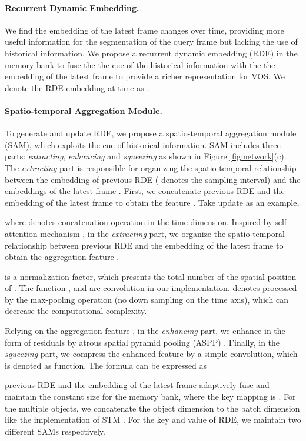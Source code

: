 \documentclass[10pt,twocolumn,letterpaper]{article}
\begin{document}
\paragraph{Recurrent Dynamic Embedding.}
We find the embedding of the latest frame changes over time, providing more useful information for the segmentation of the query frame but lacking the use of historical information. We propose a recurrent dynamic embedding (RDE) in the memory bank to fuse the the cue of the historical information with the the embedding of the latest frame to provide a richer representation for VOS. We denote the RDE embedding at time  as .  
\paragraph{Spatio-temporal Aggregation Module.} 
To generate and update RDE, we propose a spatio-temporal aggregation module (SAM), which exploits the cue of historical information.  SAM includes three parts: \textit{extracting}, \textit{enhancing} and \textit{squeezing} as shown in Figure \ref{fig:network}(c). The \textit{extracting} part is responsible for organizing the spatio-temporal relationship between the embedding of previous RDE  ( denotes the sampling interval) and the embeddings of the latest frame . First, we concatenate previous RDE  and the embedding of the latest frame  to obtain the feature . Take  update as an example,  

where  denotes concatenation operation in the time dimension. Inspired by self-attention mechanism \cite{wang2018non}, in the \textit{extracting} part, we organize the spatio-temporal relationship between  previous RDE  and the embedding of the latest frame  to obtain the aggregation feature ,
 
 is a normalization factor, which presents the total number of the spatial position of . The function ,  and  are  convolution in our implementation.  denotes  processed by the max-pooling operation (no down sampling on the time axis), which can decrease the computational complexity. 

Relying on the aggregation feature , in the \textit{enhancing} part, we enhance   in the form of residuals by atrous spatial pyramid pooling (ASPP) \cite{chen2017deeplab}. Finally, in the \textit{squeezing} part, we compress the enhanced feature by a simple  convolution, which is denoted as   function. The formula can be expressed as

previous RDE and the embedding of the latest frame adaptively fuse and maintain the constant size for the memory bank, where the key mapping is   . For the multiple objects, we concatenate the object dimension to the batch dimension like the implementation of STM \cite{oh2019video}. For the key and value of RDE, we maintain two different SAMs respectively.
\end{document}
